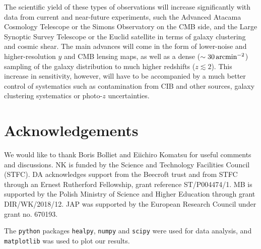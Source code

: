 \documentclass[useAMS,usenatbib]{mn2e}
\begin{document}
  The scientific yield of these types of observations will increase significantly with data from current and near-future experiments, such the Advanced Atacama Cosmology Telescope \citep{2016SPIE.9910E..14D} or the Simons Observatory \citep{2019JCAP...02..056A} on the CMB side, and the Large Synoptic Survey Telescope \citep{2009arXiv0912.0201L} or the Euclid satellite \citep{2011arXiv1110.3193L} in terms of galaxy clustering and cosmic shear. The main advances will come in the form of lower-noise and higher-resolution $y$ and CMB lensing maps, as well as a dense ($\sim30\,{\rm arcmin}^{-2}$) sampling of the galaxy distribution to much higher redshifts ($z\lesssim2$). This increase in sensitivity, however, will have to be accompanied by a much better control of systematics such as contamination from CIB and other sources, galaxy clustering systematics or photo-$z$ uncertainties.

\section*{Acknowledgements}
  We would like to thank Boris Bolliet and Eiichiro Komatsu for useful comments and discussions. NK is funded by the Science and Technology Facilities Council (STFC). DA acknowledges support from the Beecroft trust and from STFC through an Ernest Rutherford Fellowship, grant reference ST/P004474/1. MB is supported by the Polish Ministry of Science and Higher Education through grant DIR/WK/2018/12. JAP was supported by the European Research Council under grant no. 670193.
  
  The {\tt python} packages {\tt healpy}, {\tt numpy} and {\tt scipy} were used for data analysis, and {\tt matplotlib} was used to plot our results.
  
\setlength{\bibhang}{2.0em}
\setlength{}

\end{document}
